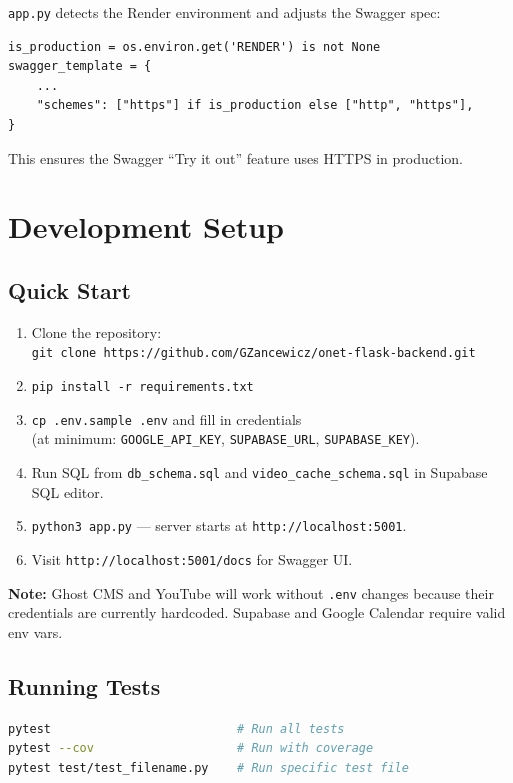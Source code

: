 \documentclass[12pt]{article}
\begin{document}
\texttt{app.py} detects the Render environment and adjusts the Swagger spec:
\begin{lstlisting}[basicstyle=\ttfamily\footnotesize]
is_production = os.environ.get('RENDER') is not None
swagger_template = {
    ...
    "schemes": ["https"] if is_production else ["http", "https"],
}
\end{lstlisting}
This ensures the Swagger ``Try it out'' feature uses HTTPS in production.

\section{Development Setup}

\subsection{Quick Start}
\begin{enumerate}
    \item Clone the repository:\\
    \texttt{git clone https://github.com/GZancewicz/onet-flask-backend.git}
    \item \texttt{pip install -r requirements.txt}
    \item \texttt{cp .env.sample .env} and fill in credentials\\(at minimum: \texttt{GOOGLE\_API\_KEY}, \texttt{SUPABASE\_URL}, \texttt{SUPABASE\_KEY}).
    \item Run SQL from \texttt{db\_schema.sql} and \texttt{video\_cache\_schema.sql} in Supabase SQL editor.
    \item \texttt{python3 app.py} --- server starts at \texttt{http://localhost:5001}.
    \item Visit \texttt{http://localhost:5001/docs} for Swagger UI.
\end{enumerate}

\textbf{Note:} Ghost CMS and YouTube will work without \texttt{.env} changes because their credentials are currently hardcoded. Supabase and Google Calendar require valid env vars.

\subsection{Running Tests}
\begin{lstlisting}[language=bash, basicstyle=\ttfamily\footnotesize, frame=none, numbers=none]
pytest                          # Run all tests
pytest --cov                    # Run with coverage
pytest test/test_filename.py    # Run specific test file
\end{lstlisting}
\end{document}
